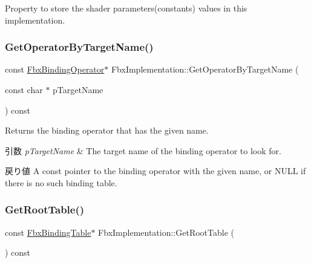 Property to store the shader parameters(constants) values in this implementation. 

\mbox{\label{class_fbx_implementation_aa38e6cb27a349e77f3137e2f09c9ffde}} 
\subsubsection{\texorpdfstring{Get\+Operator\+By\+Target\+Name()}{GetOperatorByTargetName()}}
{\footnotesize\ttfamily const \hyperlink{class_fbx_binding_operator}{Fbx\+Binding\+Operator}$\ast$ Fbx\+Implementation\+::\+Get\+Operator\+By\+Target\+Name (\begin{DoxyParamCaption}\item[{const char $\ast$}]{p\+Target\+Name }\end{DoxyParamCaption}) const}

Returns the binding operator that has the given name. 
\begin{DoxyParams}{引数}
{\em p\+Target\+Name} & The target name of the binding operator to look for. \\
\hline
\end{DoxyParams}
\begin{DoxyReturn}{戻り値}
A const pointer to the binding operator with the given name, or N\+U\+LL if there is no such binding table. 
\end{DoxyReturn}
\mbox{\label{class_fbx_implementation_a627e85260da5dd853a7a0a0660229254}} 
\subsubsection{\texorpdfstring{Get\+Root\+Table()}{GetRootTable()}\hspace{0.1cm}{\footnotesize\ttfamily [1/2]}}
{\footnotesize\ttfamily const \hyperlink{class_fbx_binding_table}{Fbx\+Binding\+Table}$\ast$ Fbx\+Implementation\+::\+Get\+Root\+Table (\begin{DoxyParamCaption}{ }\end{DoxyParamCaption}) const}

